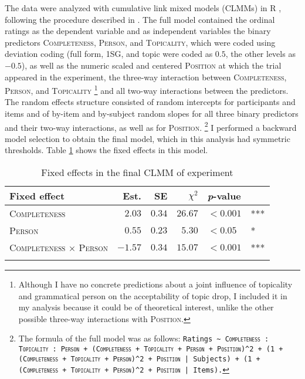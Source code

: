 \largerpage[-1]
\noindent
The data were analyzed with cumulative link mixed models (CLMMs) \citep{christensen2019} in R \citep{rcoreteam2021}, following the procedure described in .
The full model contained the ordinal ratings as the dependent variable and as independent variables the binary predictors \textsc{Completeness}, \textsc{Person}, and \textsc{Topicality}, which were coded using deviation coding (full form, 1SG, and topic were coded as $0.5$, the other levels as $-0.5$), as well as the numeric scaled and centered \textsc{Position} at which the trial appeared in the experiment, the three-way interaction between \textsc{Completeness}, \textsc{Person}, and \textsc{Topicality}%
\footnote{Although I have no concrete predictions about a joint influence of topicality and grammatical person on the acceptability of topic drop, I included it in my analysis because it could be of theoretical interest, unlike the other possible three-way interactions with \textsc{Position}.}
%
and all two-way interactions between the predictors.
The random effects structure consisted of random intercepts for participants and items and of by-item and by-subject random slopes for all three binary predictors and their two-way interactions, as well as for \textsc{Position}.%
\footnote{The formula of the full model was as follows: \texttt{Ratings \textasciitilde ~\textsc{Completeness} : \textsc{Topicality} : \textsc{Person} + (\textsc{Completeness} + \textsc{Topicality} + \textsc{Person} + \textsc{Position})\textasciicircum2 + (1 + (\textsc{Completeness} + \textsc{Topicality} + \textsc{Person})\textasciicircum2 + \textsc{Position} | Subjects) + (1 + (\textsc{Completeness} + \textsc{Topicality} + \textsc{Person})\textasciicircum2 + \textsc{Position} | Items).}}
I performed a backward model selection to obtain the final model, which in this analysis had symmetric thresholds.
Table \ref{tab:model.exp.top.q1} shows the fixed effects in this model.

\begin{table}
\caption{Fixed effects in the final CLMM of experiment }
\centering
\begin{tabular}{lrrrll}
\lsptoprule
Fixed effect & Est. & SE & $\chi^2$ & \textit{p}-value &   \\
\midrule
\textsc{Completeness} & $2.03$ & $0.34$ & $26.67$ & $< 0.001$ & ***\\
\textsc{Person} & $0.55$ & $0.23$ & $5.30$ & $< 0.05$ & *\\
\textsc{Completeness $\times$ Person} & $-1.57$ & $0.34$ & $15.07$ & $< 0.001$ & ***\\
\lspbottomrule
\end{tabular}
\label{tab:model.exp.top.q1}
\end{table}

